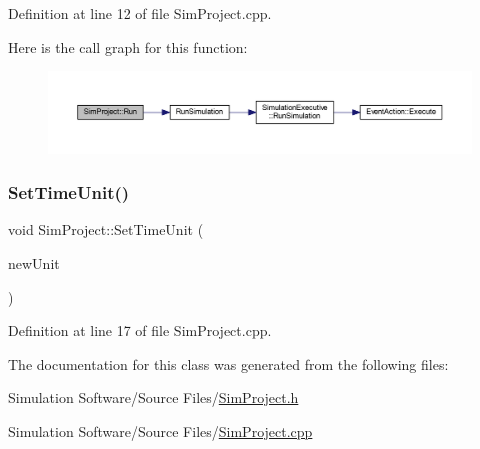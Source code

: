 Definition at line 12 of file Sim\+Project.\+cpp.

Here is the call graph for this function\+:
\nopagebreak
\begin{figure}[H]
\begin{center}
\leavevmode
\includegraphics[width=350pt]{class_sim_project_a955725a364c7a26c2991a0013976fc73_cgraph}
\end{center}
\end{figure}
\mbox{\label{class_sim_project_aa54bb0c929580649657d667f4c19646c}} 
\subsubsection{\texorpdfstring{Set\+Time\+Unit()}{SetTimeUnit()}}
{\footnotesize\ttfamily void Sim\+Project\+::\+Set\+Time\+Unit (\begin{DoxyParamCaption}\item[{\hyperlink{_simulation_executive_8h_add9fe45e09605eee3e4a39c8a5c4476d}{Time\+Unit}}]{new\+Unit }\end{DoxyParamCaption})}



Definition at line 17 of file Sim\+Project.\+cpp.



The documentation for this class was generated from the following files\+:\begin{DoxyCompactItemize}
\item 
Simulation Software/\+Source Files/\hyperlink{_sim_project_8h}{Sim\+Project.\+h}\item 
Simulation Software/\+Source Files/\hyperlink{_sim_project_8cpp}{Sim\+Project.\+cpp}\end{DoxyCompactItemize}
